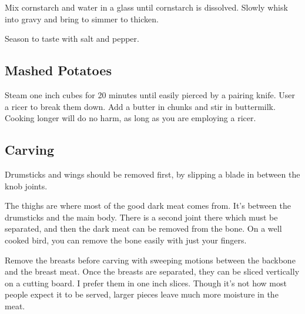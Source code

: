 \begin{recipe}
Mix cornstarch and water in a glass until cornstarch is dissolved. Slowly whisk into gravy and bring to simmer to thicken.

Season to taste with salt and pepper.

\subsection{Mashed Potatoes}


Steam one inch cubes for 20 minutes until easily pierced by a pairing knife. User a ricer to break them down. Add a butter in chunks and stir in buttermilk. Cooking longer will do no harm, as long as you are employing a ricer.

\newpage
\subsection{Carving}

Drumsticks and wings should be removed first, by slipping a blade in between the knob joints.

The thighs are where most of the good dark meat comes from. It's between the drumsticks and the main body. There is a second joint there which must be separated, and then the dark meat can be removed from the bone. On a well cooked bird, you can remove the bone easily with just your fingers.

Remove the breasts before carving with sweeping motions between the backbone and the breast meat.
Once the breasts are separated, they can be sliced vertically on a cutting board.
I prefer them in one inch slices.
Though it's not how most people expect it to be served, larger pieces leave much more moisture in the meat.

\end{recipe}

